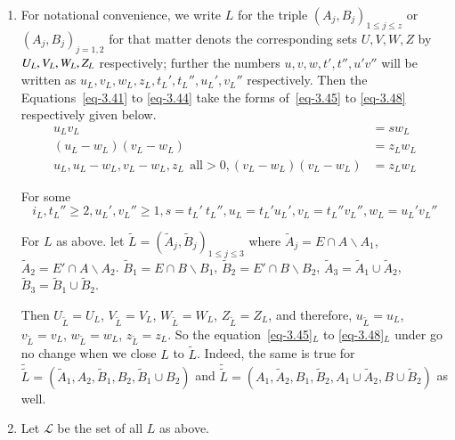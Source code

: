 \documentclass[a4paper,12pt]{article}
\theoremstyle{definition}
\theoremstyle{underlinethm}
\theoremstyle{definition}
\begin{document}
\begin{enumerate}[label=(\alph*)]
\item For notational convenience, we write $L$ for the triple $(A_{j}, B_{j})_{1 \leq j \leq z}$ or\break $(A_{j}, B_{j})_{j=1,2}$ for that matter denots the corresponding sets $U, V, W, Z$ by $U_{L}, V_{L},\break W_{L}, Z_{L}$ respectively; further the numbers $u,v,w, t', t'', u' v''$ will be written as $u_{L}, v_{L}, w_{L}, z_{L}, t_{L}', t_{L}'', u_{L}', v_{L}''$ respectively. Then the Equations~\eqref{eq-3.41} to \eqref{eq-3.44} take the forms of~\eqref{eq-3.45} to \eqref{eq-3.48} respectively given below.
\begin{align*}
u_{L} v_{L} &= sw_{L}\tag{3.45}\label{eq-3.45}\\
(u_{L}- w_{L}) (v_{L} - w_{L}) &= z_{L} w_{L}\tag{3.46}\label{eq-3.46}\\
u_{L}, u_{L}-w_{L}, v_{L}-w_{L}, z_{L}~~\text{all} > 0, (v_{L}- w_{L})(v_{L}-w_{L}) &= z_{L}w_{L}\tag{3.47}\label{eq-3.47}
\end{align*}

For some 
\begin{equation}
i_{L}, t_{L}'' \geq 2, u_{L}', v_{L}'' \geq 1, s=t_{L}'~t_{L}'', u_{L}= t_{L}' u_{L}', v_{L} = t_{L}'' v_{L}'', w_{L} = u_{L}' v_{L}'' \tag{3.48}\label{eq-3.48}
\end{equation}

For $L$ as above. let $\widetilde{L} = (\widetilde{A}_{j}, \widetilde{B}_{j})_{1 \leq j \leq 3}$ where $\widetilde{A}_{j} = E \cap A \smallsetminus A_{1}$, $\widetilde{A}_{2} = E' \cap A \smallsetminus A_{2}$. $\widetilde{B}_{1} = E \cap B \smallsetminus B_{1}$, $\widetilde{B}_{2} = E' \cap B \smallsetminus B_{2}$, $\widetilde{A}_{3} = \widetilde{A}_{1} \cup \widetilde{A}_{2}$, $\widetilde{B}_{3} = \widetilde{B}_{1} \cup \widetilde{B}_{2}$.

Then $U_{\widetilde{L}} = U_{L}$, $V_{\widetilde{L}} = V_{L}$, $W_{\widetilde{L}} =W_{L}$, $Z_{\widetilde{L}} =Z_{L}$, and therefore, $u_{\widetilde{L}} = u_{L}$, $v_{\widetilde{L}} = v_{L}$, $w_{\widetilde{L}} = w_{L}$, $z_{\widetilde{L}} =z_{L}$. So the equation~\eqref{eq-3.45}$_{L}$ to \eqref{eq-3.48}$_{L}$
under go no change when we close $L$ to $\widetilde{L}$. Indeed, the same is true for $\widetilde{\widetilde{L}} = (\widetilde{A}_{1}, A_{2}, \widetilde{B}_{1}, B_{2}, \widetilde{B}_{1} \cup B_{2})$ and $\widetilde{\widetilde{L}} = (A_{1}, \widetilde{A}_{2}, B_{1}, \widetilde{B}_{2}, A_{1} \cup \widetilde{A}_{2}, B \cup \widetilde{B}_{2})$ as well.

\item Let $\mathcal{L}$ be the set of all $L$ as above.


\end{enumerate}
\end{document}
